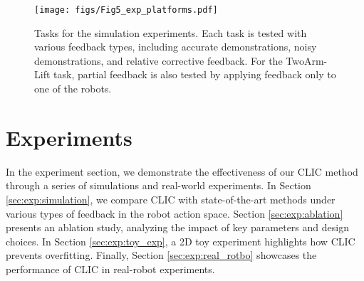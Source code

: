

\begin{figure}[t]
	\centering
	\texttt{[image: figs/Fig5\_exp\_platforms.pdf]}
	\caption{Tasks for the simulation experiments. Each task is tested with various feedback types, including accurate demonstrations, noisy demonstrations, and relative corrective feedback. For the TwoArm-Lift task, partial feedback is also tested by applying feedback only to one of the robots.}
	\label{fig:tasks}
\end{figure}





\section{Experiments}
\label{sec:experiments}

In the experiment section, we demonstrate the effectiveness of our CLIC method through a series of simulations and real-world experiments. In Section \ref{sec:exp:simulation}, we compare CLIC with state-of-the-art methods under various types of feedback in the robot action space. Section \ref{sec:exp:ablation} presents an ablation study, analyzing the impact of key parameters and design choices. In Section \ref{sec:exp:toy_exp}, a 2D toy experiment highlights how CLIC prevents overfitting. Finally, Section \ref{sec:exp:real_rotbo} showcases the performance of CLIC in real-robot experiments.


